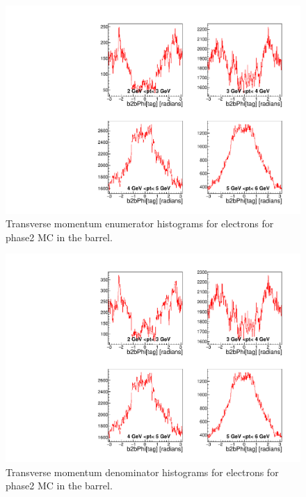 \documentclass[a4paper,11pt,twosided,final,german,openbib,pdftex,listof=totoc,bibliography=totoc]{scrbook}
\begin{document}
\begin{appendix}
\begin{figure}[!htbp]
	\centering
	\includegraphics[width=\textwidth]{Plots/master/xPtMPhiemBarrelE_MC}
	\caption[Transverse Momentum $\phi$ Electron Barrel Enumerator Histogram Phase2 MC]{Transverse momentum enumerator histograms for electrons for phase2 MC in the barrel.}
	\label{plt:PtMPhiemBarrelE_MC}
\end{figure}

\begin{figure}[!htbp]
	\centering
	\includegraphics[width=\textwidth]{Plots/master/xPtMPhiemBarrelD_MC}
	\caption[Transverse Momentum $\phi$ Electron Barrel Denominator Histogram Phase2 MC]{Transverse momentum denominator histograms for electrons for phase2 MC in the barrel.}
	\label{plt:PtMPhiemBarrelD_MC}
\end{figure}



\end{appendix}
\end{document}
